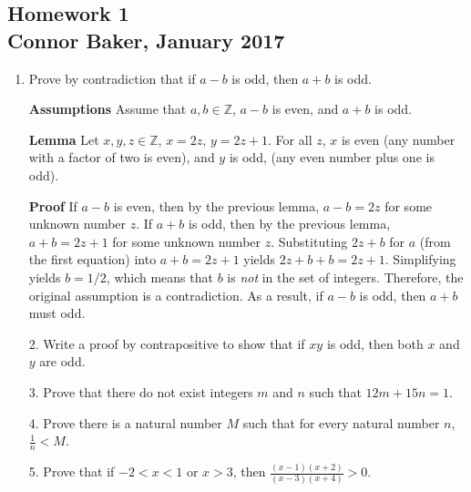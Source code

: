 \documentclass[12pt]{article}
\begin{document}
\begin{center}
\subsection*{Homework 1\\Connor Baker, January 2017}
\end{center}

\begin{enumerate}
\item Prove by contradiction that if $a-b$ is odd, then $a+b$ is odd.
\end{enumerate}

\begin{enumerate}
  \item[\textbf{Assumptions}] Assume that $a,b \in\mathbb{Z}$, $a-b$ is even, and $a+b$ is odd.
\end{enumerate}

\begin{enumerate}
  \item[\textbf{Lemma}] Let $x,y,z \in\mathbb{Z}$, $x=2z$, $y=2z+1$. For all $z$, $x$ is even (any number with a factor of two is even), and $y$ is odd, (any even number plus one is odd).
\end{enumerate}

\begin{enumerate}
  \item[\textbf{Proof}] If $a-b$ is even, then by the previous lemma, $a-b=2z$ for some unknown number $z$. If $a+b$ is odd, then by the previous lemma, $a+b=2z+1$ for some unknown number $z$. Substituting $2z+b$ for $a$ (from the first equation) into $a+b=2z+1$ yields $2z+b+b=2z+1$. Simplifying yields $b=1/2$, which means that $b$ is \textit{not} in the set of integers. Therefore, the original assumption is a contradiction. As a result, if $a-b$ is odd, then $a+b$ must odd.
\end{enumerate}


\begin{enumerate}
\item[2.] Write a proof by contrapositive to show that if $xy$ is odd, then both $x$ and $y$ are odd.
\end{enumerate}

\begin{enumerate}
\item[3.] Prove that there do not exist integers $m$ and $n$ such that $12m + 15n = 1$.
\end{enumerate}

\begin{enumerate}
\item[4.] Prove there is a natural number $M$  such that for every natural number $n$, $\frac{1}{n} < M$.
\end{enumerate}

\begin{enumerate}
\item[5.] Prove that if $-2 < x < 1$ or $x > 3$, then $\frac{(x-1)(x+2)}{(x-3)(x+4)} > 0.$
\end{enumerate}
\end{document}
